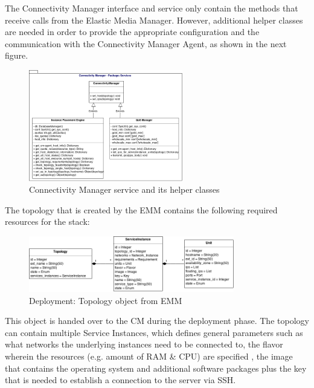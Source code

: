 The Connectivity Manager interface and service only contain the methods that receive calls from the Elastic Media Manager. However, additional helper classes are needed in order to provide the appropriate configuration and the communication with the Connectivity Manager Agent, as shown in the next figure.

\begin{figure}[H]
\centering

\includegraphics[width=0.6\textwidth]{images/design/cm_class_diagram}

\caption{Connectivity Manager service and its helper classes}
\end{figure}

The topology that is created by the EMM contains the following required resources for the stack:

\begin{figure}[H]
\centering

\includegraphics[width=0.8\textwidth]{images/design/cm_topology_object}

\caption{Deployment: Topology object from EMM}
\end{figure}

This object is handed over to the CM during the deployment phase. The topology can contain multiple Service Instances, which defines general parameters such as what networks the underlying instances need to be connected to, the flavor wherein the resources (e.g. amount of RAM \& CPU) are specified \cite{openstack-admin}, the image that contains the operating system and additional software packages plus the key that is needed to establish a connection to the server via SSH.

